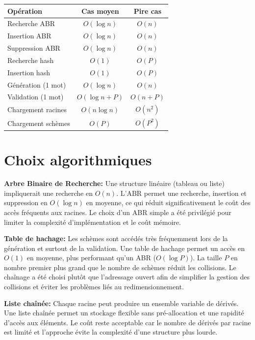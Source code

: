 \documentclass[11pt,a4paper]{article}
\begin{document}
\begin{center}
\renewcommand{\arraystretch}{1.3}
\begin{tabular}{lcc}
\toprule
\textbf{Opération} & \textbf{Cas moyen} & \textbf{Pire cas} \\
\midrule
Recherche ABR            & $O(\log n)$         & $O(n)$ \\
Insertion ABR            & $O(\log n)$         & $O(n)$ \\
Suppression ABR          & $O(\log n)$         & $O(n)$ \\
Recherche hash           & $O(1)$              & $O(P)$ \\
Insertion hash           & $O(1)$              & $O(P)$ \\
Génération (1 mot)       & $O(\log n)$         & $O(n)$ \\
Validation (1 mot)       & $O(\log n + P)$     & $O(n + P)$ \\
Chargement racines       & $O(n\log n)$         & $O(n^2)$ \\
Chargement schèmes       & $O(P)$               & $O(P^2)$ \\
\bottomrule
\end{tabular}
\end{center}

\section{Choix algorithmiques}

\textbf{Arbre Binaire de Recherche:}  
Une structure linéaire (tableau ou liste) impliquerait une recherche en $O(n)$.  
L’ABR permet une recherche, insertion et suppression en $O(\log n)$ en moyenne, ce qui réduit significativement le coût des accès fréquents aux racines.  
Le choix d’un ABR simple a été privilégié pour limiter la complexité d’implémentation et le coût mémoire.

\textbf{Table de hachage:}  
Les schèmes sont accédés très fréquemment lors de la génération et surtout de la validation.  
Une table de hachage permet un accès en $O(1)$ en moyenne, plus performant qu’un ABR ($O(\log P)$).  
La taille $P$ en nombre premier plus grand que le nombre de schèmes réduit les collisions.  
Le chaînage a été choisi plutôt que l’adressage ouvert afin de simplifier la gestion des collisions et éviter les problèmes liés au redimensionnement.

\textbf{Liste chaînée:}  
Chaque racine peut produire un ensemble variable de dérivés.  
Une liste chaînée permet un stockage flexible sans pré-allocation et une rapidité d'accès aux éléments.  
Le coût reste acceptable car le nombre de dérivés par racine est limité et l’approche évite la complexité d’une structure plus lourde.
\end{document}
